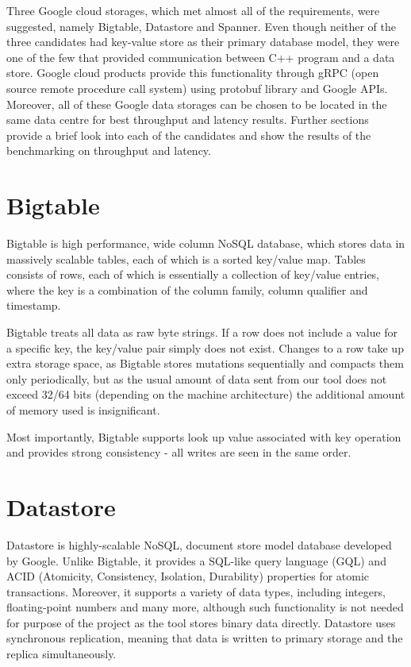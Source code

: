 \documentclass[bsc,frontabs,twoside,singlespacing,parskip,deptreport]{infthesis}     %
\begin{document}
Three Google cloud storages, which met almost all of the requirements, were suggested, namely Bigtable, Datastore and Spanner. Even though neither of the three candidates had key-value store as their primary database model, they were one of the few that provided communication between C++ program and a data store. Google cloud products provide this functionality through gRPC (open source remote procedure call system) using protobuf library and Google APIs. Moreover, all of these Google data storages can be chosen to be located in the same data centre for best throughput and latency results. Further sections provide a brief look into each of the candidates and show the results of the benchmarking on throughput and latency.

\section{Bigtable}

Bigtable \citep{google-bigtable} is high performance, wide column NoSQL database, which stores data in massively scalable tables, each of which is a sorted key/value map. Tables consists of rows, each of which is essentially a collection of key/value entries, where the key is a combination of the column family, column qualifier and timestamp. 

Bigtable treats all data as raw byte strings. If a row does not include a value for a specific key, the key/value pair simply does not exist. Changes to a row take up extra storage space, as Bigtable stores mutations sequentially and compacts them only periodically, but as the usual amount of data sent from our tool does not exceed 32/64 bits (depending on the machine architecture) the additional amount of memory used is insignificant. 

Most importantly, Bigtable supports look up value associated with key operation and provides strong consistency - all writes are seen in the same order.

\section{Datastore}

Datastore \citep{google-datastore} is highly-scalable NoSQL, document store model database developed by Google. Unlike Bigtable, it provides a SQL-like query language (GQL) and ACID (Atomicity, Consistency, Isolation, Durability) properties for atomic transactions. Moreover, it supports a variety of data types, including integers, floating-point numbers and many more, although such functionality is not needed for purpose of the project as the tool stores binary data directly. Datastore uses synchronous replication, meaning that data is written to primary storage and the replica simultaneously.
\end{document}
